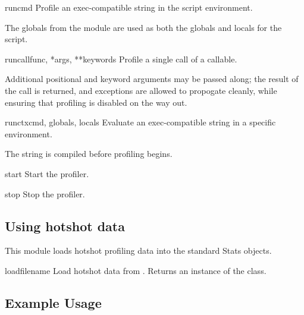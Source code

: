 \begin{methoddesc}{run}{cmd}
Profile an exec-compatible string in the script environment.

The globals from the  module are used as 
both the globals and locals for the script.
\end{methoddesc}

\begin{methoddesc}{runcall}{func, *args, **keywords}
Profile a single call of a callable.

Additional positional and keyword arguments may be passed
along; the result of the call is returned, and exceptions are
allowed to propogate cleanly, while ensuring that profiling is
disabled on the way out.
\end{methoddesc}


\begin{methoddesc}{runctx}{cmd, globals, locals}
Evaluate an exec-compatible string in a specific environment.

The string is compiled before profiling begins.
\end{methoddesc}

\begin{methoddesc}{start}{}
Start the profiler.
\end{methoddesc}

\begin{methoddesc}{stop}{}
Stop the profiler.
\end{methoddesc}

\subsection{Using hotshot data}



This module loads hotshot profiling data into the standard  
Stats objects.

\begin{funcdesc}{load}{filename}
Load hotshot data from . Returns an instance 
of the  class.
\end{funcdesc}

\begin{seealso}
\end{seealso}

\subsection{Example Usage \label{hotshot-example}}

